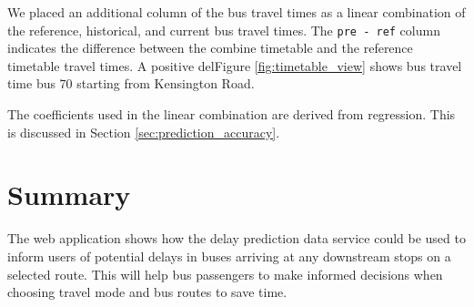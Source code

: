 \par We placed an additional column of the bus travel times as a linear combination of the reference, historical, and current bus travel times. The \texttt{pre - ref} column indicates the difference between the combine timetable and the reference timetable travel times. A positive delFigure \ref{fig:timetable_view} shows bus travel time bus 70 starting from Kensington Road.

\par The coefficients used in the linear combination are derived from regression. This is discussed in Section \ref{sec:prediction_accuracy}.



\section{Summary}
\par The web application shows how the delay prediction data service could be used to inform users of potential delays in buses arriving at any downstream stops on a selected route. This will help bus passengers to make informed decisions when choosing travel mode and bus routes to save time.

